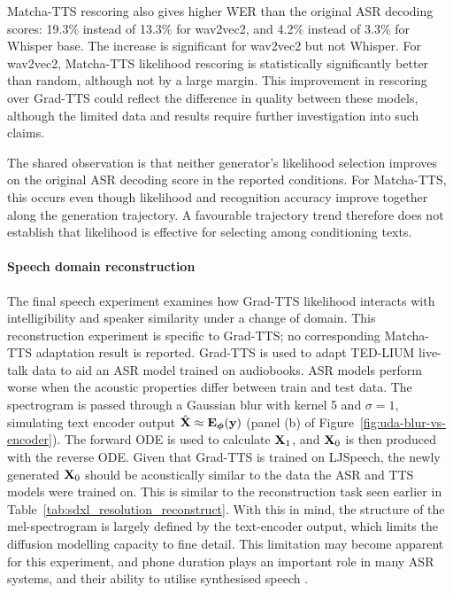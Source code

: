Matcha-TTS rescoring also gives higher \ac{WER} than the original \ac{ASR} decoding scores: 19.3\% instead of 13.3\% for wav2vec2, and 4.2\% instead of 3.3\% for Whisper base. The increase is significant for wav2vec2 but not Whisper. For wav2vec2, Matcha-TTS likelihood rescoring is statistically significantly better than random, although not by a large margin. This improvement in rescoring over Grad-TTS could reflect the difference in quality between these models, although the limited data and results require further investigation into such claims.

The shared observation is that neither generator's likelihood selection improves on the original \ac{ASR} decoding score in the reported conditions. For Matcha-TTS, this occurs even though likelihood and recognition accuracy improve together along the generation trajectory. A favourable trajectory trend therefore does not establish that likelihood is effective for selecting among conditioning texts.

\paragraph{Speech domain reconstruction} The final speech experiment examines how Grad-TTS likelihood interacts with intelligibility and speaker similarity under a change of domain. This reconstruction experiment is specific to Grad-TTS; no corresponding Matcha-TTS adaptation result is reported. Grad-TTS is used to adapt TED-LIUM live-talk data \citep{rousseauTEDLIUMAutomaticSpeech2012} to aid an ASR model trained on audiobooks. ASR models perform worse when the acoustic properties differ between train and test data. The spectrogram is passed through a Gaussian blur with kernel 5 and $\sigma=1$, simulating text encoder output $\hat{{\mathbf{X}}} \approx {\mathbf{E}}_{\bm{\phi}}({\mathbf{y}})$ (panel (b) of Figure~\ref{fig:uda-blur-vs-encoder}). The forward ODE is used to calculate ${\mathbf{X}}_1$, and ${\mathbf{X}}_0$ is then produced with the reverse ODE. Given that Grad-TTS is trained on LJSpeech, the newly generated ${\mathbf{X}}_0$ should be acoustically similar to the data the ASR and TTS models were trained on. This is similar to the reconstruction task seen earlier in Table~\ref{tab:sdxl_resolution_reconstruct}. With this in mind, the structure of the mel-spectrogram is largely defined by the text-encoder output, which limits the diffusion modelling capacity to fine detail. This limitation may become apparent for this experiment, and phone duration plays an important role in many ASR systems, and their ability to utilise synthesised speech \cite{nick2023asrtts}.

